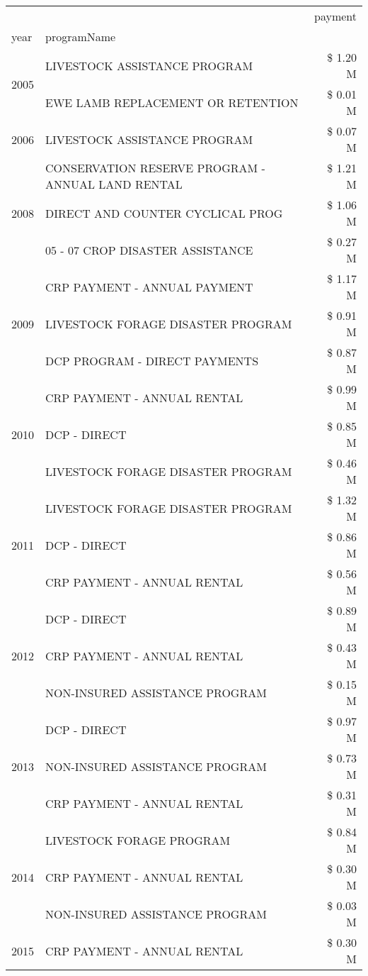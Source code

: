 \begin{tabular}{llr}
\toprule
 &  & payment \\
year & programName &  \\
\midrule
\multirow[t]{2}{*}{2005} & LIVESTOCK ASSISTANCE PROGRAM & \$ 1.20 M \\
 & EWE LAMB REPLACEMENT OR RETENTION & \$ 0.01 M \\
\cline{1-3}
2006 & LIVESTOCK ASSISTANCE PROGRAM & \$ 0.07 M \\
\cline{1-3}
\multirow[t]{3}{*}{2008} & CONSERVATION RESERVE PROGRAM - ANNUAL LAND RENTAL & \$ 1.21 M \\
 & DIRECT AND COUNTER CYCLICAL PROG & \$ 1.06 M \\
 & 05 - 07 CROP DISASTER ASSISTANCE & \$ 0.27 M \\
\cline{1-3}
\multirow[t]{3}{*}{2009} & CRP PAYMENT - ANNUAL PAYMENT & \$ 1.17 M \\
 & LIVESTOCK FORAGE DISASTER  PROGRAM & \$ 0.91 M \\
 & DCP PROGRAM - DIRECT PAYMENTS & \$ 0.87 M \\
\cline{1-3}
\multirow[t]{3}{*}{2010} & CRP PAYMENT - ANNUAL RENTAL & \$ 0.99 M \\
 & DCP - DIRECT & \$ 0.85 M \\
 & LIVESTOCK FORAGE DISASTER PROGRAM & \$ 0.46 M \\
\cline{1-3}
\multirow[t]{3}{*}{2011} & LIVESTOCK FORAGE DISASTER PROGRAM & \$ 1.32 M \\
 & DCP - DIRECT & \$ 0.86 M \\
 & CRP PAYMENT - ANNUAL RENTAL & \$ 0.56 M \\
\cline{1-3}
\multirow[t]{3}{*}{2012} & DCP - DIRECT & \$ 0.89 M \\
 & CRP PAYMENT - ANNUAL RENTAL & \$ 0.43 M \\
 & NON-INSURED ASSISTANCE PROGRAM & \$ 0.15 M \\
\cline{1-3}
\multirow[t]{3}{*}{2013} & DCP - DIRECT & \$ 0.97 M \\
 & NON-INSURED ASSISTANCE PROGRAM & \$ 0.73 M \\
 & CRP PAYMENT - ANNUAL RENTAL & \$ 0.31 M \\
\cline{1-3}
\multirow[t]{3}{*}{2014} & LIVESTOCK FORAGE PROGRAM & \$ 0.84 M \\
 & CRP PAYMENT - ANNUAL RENTAL & \$ 0.30 M \\
 & NON-INSURED ASSISTANCE PROGRAM & \$ 0.03 M \\
\cline{1-3}
\multirow[t]{3}{*}{2015} & CRP PAYMENT - ANNUAL RENTAL & \$ 0.30 M \\

\end{tabular}
